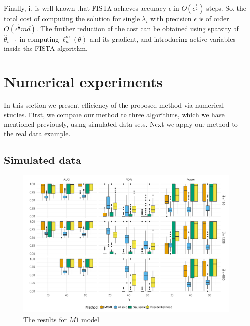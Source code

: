 \documentclass[twoside,11pt]{article}
\def\th{\theta}
\begin{document}
Finally, it is well-known that FISTA \citep{FISTA} achieves accuracy $\epsilon$ in $O({\epsilon}^{\frac{1}{2}})$ steps. So, the total cost of computing the solution for single $\lambda_i$ with precision $\epsilon$
is of order $O({\epsilon}^{\frac{1}{2}}md)$. The further reduction of the cost can be obtained  using sparsity of $\hat\theta_{i-1}$ in computing $\ell^m_n(\th)$ and its gradient, and  introducing active variables inside the FISTA algorithm. 






\section{Numerical experiments}\label{numerical}
In this section we present efficiency of the proposed method via numerical studies. First, we compare our method to three algorithms, which we have mentioned previously,
using simulated data sets. Next we apply our method to the real data example.

\subsection{Simulated data}\label{simulation}

\begin{figure}[htb]
 \centering
 \includegraphics[width=\textwidth]{boxplot_kratka}
 \caption{The results for $M1$ model}
 \label{fig:M1}
\end{figure}
\end{document}
